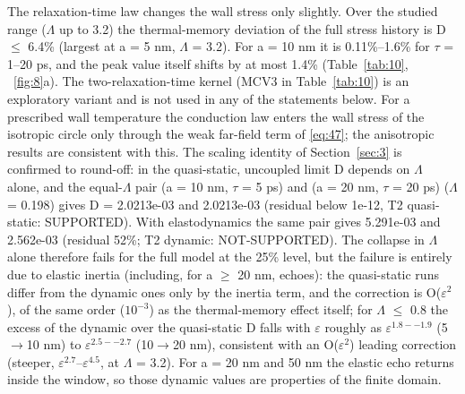 \documentclass[preprint,12pt]{elsarticle}
\begin{document}
The relaxation-time law changes the wall stress only slightly. Over the studied range ($\Lambda$ up to 3.2) the thermal-memory deviation of the full stress history is D $\leq$ 6.4\% (largest at a = 5 nm, $\Lambda$ = 3.2). For a = 10 nm it is 0.11\%--1.6\% for $\tau$ = 1--20 ps, and the peak value itself shifts by at most 1.4\% (Table~\ref{tab:10}, \figurename~\ref{fig:8}a). The two-relaxation-time kernel (MCV3 in Table~\ref{tab:10}) is an exploratory variant and is not used in any of the statements below. For a prescribed wall temperature the conduction law enters the wall stress of the isotropic circle only through the weak far-field term of \eqref{eq:47}; the anisotropic results are consistent with this. The scaling identity of Section~\ref{sec:3} is confirmed to round-off: in the quasi-static, uncoupled limit D depends on $\Lambda$ alone, and the equal-$\Lambda$ pair (a = 10 nm, $\tau$ = 5 ps) and (a = 20 nm, $\tau$ = 20 ps) ($\Lambda$ = 0.198) gives D = 2.0213e-03 and 2.0213e-03 (residual below 1e-12, T2 quasi-static: SUPPORTED). With elastodynamics the same pair gives 5.291e-03 and 2.562e-03 (residual 52\%; T2 dynamic: NOT-SUPPORTED). The collapse in $\Lambda$ alone therefore fails for the full model at the 25\% level, but the failure is entirely due to elastic inertia (including, for a $\geq$ 20 nm, echoes): the quasi-static runs differ from the dynamic ones only by the inertia term, and the correction is O($\varepsilon^{2}$), of the same order ($10^{-3}$) as the thermal-memory effect itself; for $\Lambda$ $\leq$ 0.8 the excess of the dynamic over the quasi-static D falls with $\varepsilon$ roughly as $\varepsilon^{1.8--1.9}$ (5$\to$10 nm) to $\varepsilon^{2.5--2.7}$ (10$\to$20 nm), consistent with an O($\varepsilon^{2}$) leading correction (steeper, $\varepsilon^{2.7}$--$\varepsilon^{4.5}$, at $\Lambda$ = 3.2). For a = 20 nm and 50 nm the elastic echo returns inside the window, so those dynamic values are properties of the finite domain.
\end{document}
